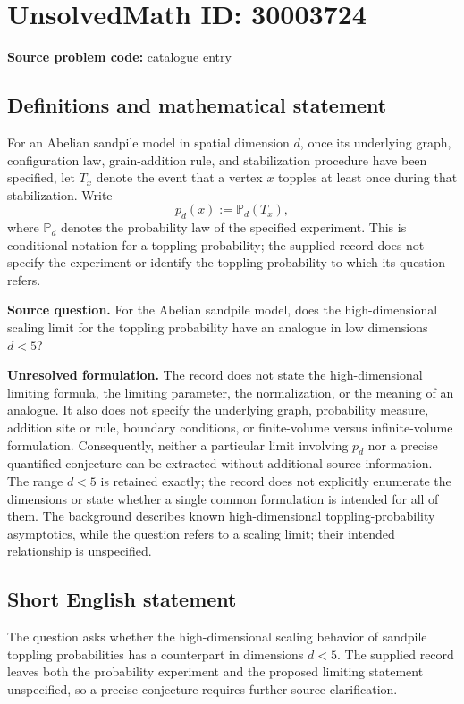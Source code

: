\documentclass[11pt]{article}
\begin{document}
\section*{UnsolvedMath ID: 30003724}
\textbf{Source problem code:} catalogue entry
\subsection{Definitions and mathematical statement}
For an Abelian sandpile model in spatial dimension \(d\), once its underlying graph, configuration law, grain-addition rule, and stabilization procedure have been specified, let \(T_x\) denote the event that a vertex \(x\) topples at least once during that stabilization. Write
\[
p_d(x):=\mathbb P_d(T_x),
\]
where \(\mathbb P_d\) denotes the probability law of the specified experiment. This is conditional notation for a toppling probability; the supplied record does not specify the experiment or identify the toppling probability to which its question refers.

\textbf{Source question.} For the Abelian sandpile model, does the high-dimensional scaling limit for the toppling probability have an analogue in low dimensions \(d<5\)?

\textbf{Unresolved formulation.} The record does not state the high-dimensional limiting formula, the limiting parameter, the normalization, or the meaning of an analogue. It also does not specify the underlying graph, probability measure, addition site or rule, boundary conditions, or finite-volume versus infinite-volume formulation. Consequently, neither a particular limit involving \(p_d\) nor a precise quantified conjecture can be extracted without additional source information. The range \(d<5\) is retained exactly; the record does not explicitly enumerate the dimensions or state whether a single common formulation is intended for all of them. The background describes known high-dimensional toppling-probability asymptotics, while the question refers to a scaling limit; their intended relationship is unspecified.
\subsection{Short English statement}
The question asks whether the high-dimensional scaling behavior of sandpile toppling probabilities has a counterpart in dimensions \(d<5\). The supplied record leaves both the probability experiment and the proposed limiting statement unspecified, so a precise conjecture requires further source clarification.
\end{document}

